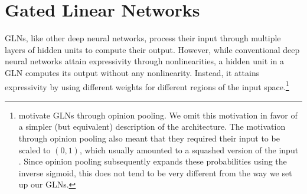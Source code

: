 \documentclass{article}
\theoremstyle{plain}
\theoremstyle{definition}
\theoremstyle{remark}
\begin{document}


\section{Gated Linear Networks}
\label{sec:glns}

GLNs, like other deep neural networks, process their input through multiple layers of hidden units to compute their output.
However, while conventional deep neural networks attain expressivity through nonlinearities, a hidden unit in a GLN computes its output without any nonlinearity.
Instead, it attains expressivity by using different weights for different regions of the input space.\footnote{\citet{veness_online_2017} motivate GLNs through opinion pooling. We omit this motivation in favor of a simpler (but equivalent) description of the architecture.
The motivation through opinion pooling also meant that they required their input to be scaled to $(0,1)$, which usually amounted to a squashed version of the input \citep{veness_gated_2021}.
Since opinion pooling subsequently expands these probabilities using the inverse sigmoid, this does not tend to be very different from the way we set up our GLNs.}
\end{document}
